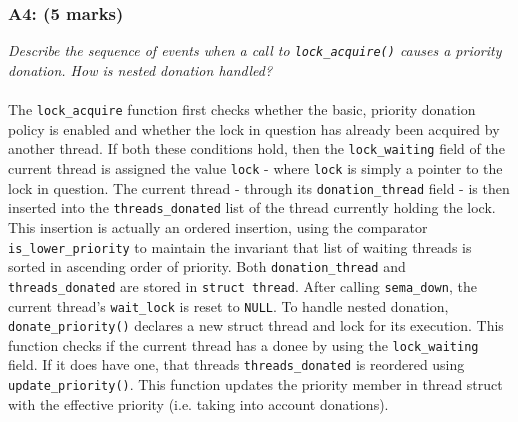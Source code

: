 \documentclass{article}
\begin{document}
\subsubsection*{A4: (5 marks) }
\textit{Describe the sequence of events when a call to \texttt{lock\_acquire()} causes a priority donation. How is nested donation handled?}
\\ \\
The \texttt{lock\_acquire} function first checks whether the basic, priority donation policy is enabled and whether the lock in question has already been acquired by another thread. If both these conditions hold, then the \texttt{lock\_waiting} field of the current thread is assigned the value \texttt{lock} - where \texttt{lock} is simply a pointer to the lock in question. The current thread - through its \texttt{donation\_thread} field - is then inserted into the \texttt{threads\_donated} list of the thread currently holding the lock. This insertion is actually an ordered insertion, using the comparator \texttt{is\_lower\_priority} to maintain the invariant that list of waiting threads is sorted in ascending order of priority. Both \texttt{donation\_thread} and \texttt{threads\_donated} are stored in \texttt{struct thread}.
After calling \texttt{sema\_down}, the current thread's \texttt{wait\_lock} is reset to \texttt{NULL}.
To handle nested donation, \texttt{donate\_priority()} declares a new struct thread and lock for its execution. This function checks if the current thread has a donee by using the \texttt{lock\_waiting} field. If it does have one, that threads \texttt{threads\_donated} is reordered using \texttt{update\_priority()}. This function updates the priority member in thread struct with the effective priority (i.e. taking into account donations).
\\\\
\end{document}
